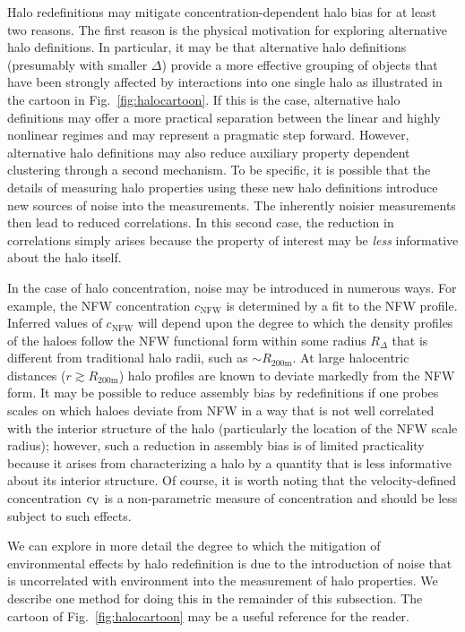\documentclass[usenatbib,fleqn]{mnras}
\begin{document}
Halo redefinitions may mitigate concentration-dependent halo bias for at least two reasons. The first reason is the physical motivation for exploring alternative halo definitions. In particular, it may be that alternative halo definitions (presumably with smaller $\Delta$) provide a more effective grouping of objects that have been strongly affected by interactions into one single halo as  illustrated in the cartoon in Fig.~\ref{fig:halocartoon}. If this is the case, alternative halo definitions may offer a more practical separation between the linear and highly nonlinear regimes and may represent a pragmatic step forward. However, alternative halo definitions may also reduce auxiliary property dependent clustering through a second mechanism. To be specific, it is possible that the details of measuring halo properties using these new halo definitions introduce new sources of noise into the measurements. The inherently noisier measurements then lead to reduced correlations. In this second case, the reduction in correlations simply arises because the property of interest may be {\em less} informative about the halo itself.

In the case of halo concentration, noise may be introduced in numerous ways. For example, the NFW concentration $c_{\mathrm{NFW}}$ is determined by a fit to the NFW profile. Inferred values of $c_{\mathrm{NFW}}$ will depend upon the degree to which the density profiles of the haloes follow the NFW functional form within some radius $R_{\Delta}$ that is different from traditional halo radii, such as $\sim R_{200\text{m}}$. At large halocentric distances ($r \gtrsim R_{200\text{m}}$) halo profiles are known to deviate markedly from the NFW form. It may be possible to reduce assembly bias by redefinitions if one probes scales on which haloes deviate from NFW in a way that is not well correlated with the interior structure of the halo (particularly the location of the NFW scale radius); however, such a reduction in assembly bias is of limited practicality because it arises from characterizing a halo by a quantity that is less informative about its interior structure. Of course, it is worth noting that the velocity-defined concentration $c_{\rm V}$ is a non-parametric measure of concentration and should be less subject to such effects. 

We can explore in more detail the degree to which the mitigation of environmental effects by halo redefinition is due to the introduction of noise that is uncorrelated with environment into the measurement of halo properties. We describe one method for doing this in the remainder of this subsection. The cartoon of Fig.~\ref{fig:halocartoon} may be a useful reference for the reader. 
\end{document}
